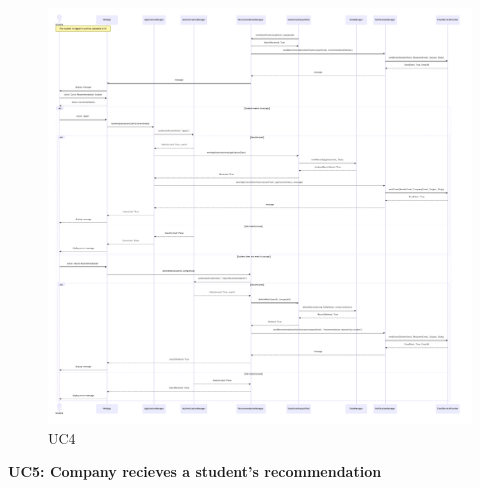 \begin{figure}[H]
    \centering
    \includegraphics[width=1.1\linewidth]{DD//Images/SequenceDiagrams/UC4.pdf}
    \caption{UC4}
\end{figure}

\newpage
\textbf{UC5: Company recieves a student's recommendation}


